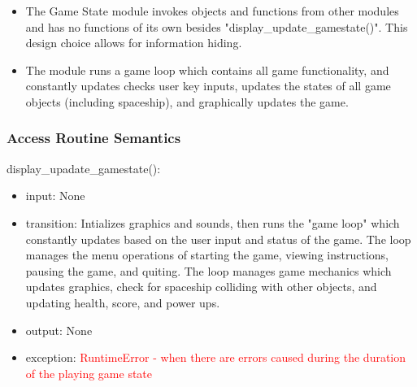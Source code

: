 \documentclass[12pt, titlepage]{article}
\begin{document}
\begin{itemize}

\item The Game State module invokes objects and functions from other modules and has no functions of its own besides "display\_update\_gamestate()". This design choice allows for information hiding. 

\item The module runs a game loop which contains all game functionality, and constantly updates checks user key inputs, updates the states of all game objects (including spaceship), and graphically updates the game. 

\end{itemize}

\subsubsection* {Access Routine Semantics}

\noindent display\_upadate\_gamestate():
\begin{itemize}
\item input: None
\item transition: 
Intializes graphics and sounds, then runs the "game loop" which constantly updates based on the user input and status of the game. The loop manages the menu operations of starting the game, viewing instructions, pausing the game, and quiting. The loop manages game mechanics which updates graphics, check for spaceship colliding with other objects, and updating health, score, and power ups.
\item output: None
\item exception: \textcolor{red}{RuntimeError - when there are errors caused during the duration of the playing game state}
\end{itemize}

\newpage
\end{document}
